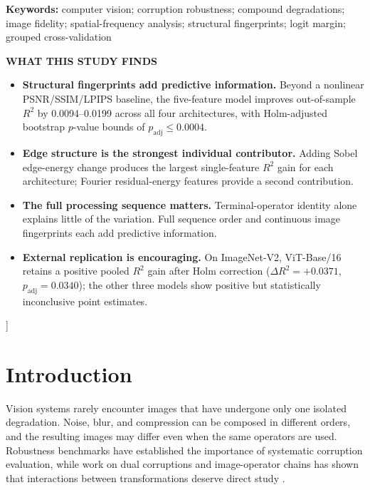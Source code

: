 \documentclass[10pt,twocolumn]{article}
\begin{document}
\begin{@twocolumnfalse}
{\small\noindent\textbf{Keywords:} computer vision; corruption robustness; compound degradations; image fidelity; spatial-frequency analysis; structural fingerprints; logit margin; grouped cross-validation}
\vspace{0.52em}
\begin{tcolorbox}
{\large\bfseries WHAT THIS STUDY FINDS\par}\vspace{0.22em}
\small
\begin{itemize}
\item \textbf{Structural fingerprints add predictive information.} Beyond a nonlinear PSNR/SSIM/LPIPS baseline, the five-feature model improves out-of-sample $R^2$ by 0.0094--0.0199 across all four architectures, with Holm-adjusted bootstrap $p$-value bounds of $p_{\mathrm{adj}}\leq 0.0004$.
\item \textbf{Edge structure is the strongest individual contributor.} Adding Sobel edge-energy change produces the largest single-feature $R^2$ gain for each architecture; Fourier residual-energy features provide a second contribution.
\item \textbf{The full processing sequence matters.} Terminal-operator identity alone explains little of the variation. Full sequence order and continuous image fingerprints each add predictive information.
\item \textbf{External replication is encouraging.} On ImageNet-V2, ViT-Base/16 retains a positive pooled $R^2$ gain after Holm correction ($\Delta R^2=+0.0371$, $p_{\mathrm{adj}}=0.0340$); the other three models show positive but statistically inconclusive point estimates.
\end{itemize}
\end{tcolorbox}
\end{@twocolumnfalse}
]

\section{Introduction}

Vision systems rarely encounter images that have undergone only one isolated degradation. Noise, blur, and compression can be composed in different orders, and the resulting images may differ even when the same operators are used. Robustness benchmarks have established the importance of systematic corruption evaluation, while work on dual corruptions and image-operator chains has shown that interactions between transformations deserve direct study \cite{hendrycks2019,goyal2022,liao2020}.
\end{document}
